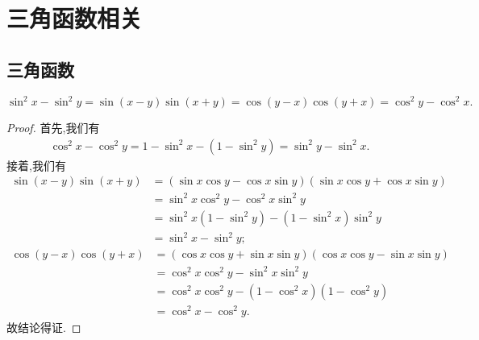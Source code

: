 \documentclass[../../main.tex]{subfiles}
\begin{document}
\section{三角函数相关}

\subsection{三角函数}

\begin{theorem}[三角平方差公式]\label{theorem:三角平方差}
$\sin^2 x-\sin^2 y=\sin(x-y)\sin(x+y)=\cos(y-x)\cos(y+x)=\cos^2 y-\cos^2 x.$
\end{theorem}
\begin{proof}
首先,我们有
\begin{align*}
\cos ^2x-\cos ^2y=1-\sin ^2x-\left( 1-\sin ^2y \right) =\sin ^2y-\sin ^2x.
\end{align*}
接着,我们有
\begin{align*}
\sin(x-y)\sin(x+y) &= (\sin x \cos y - \cos x \sin y)(\sin x \cos y + \cos x \sin y) \\
&= \sin^2 x \cos^2 y - \cos^2 x \sin^2 y \\
&= \sin^2 x (1 - \sin^2 y) - (1 - \sin^2 x) \sin^2 y \\
&= \sin^2 x - \sin^2 y;
\end{align*}
\begin{align*}
\cos(y-x)\cos(y+x) &= (\cos x \cos y + \sin x \sin y)(\cos x \cos y - \sin x \sin y) \\
&= \cos^2 x \cos^2 y - \sin^2 x \sin^2 y \\
&= \cos^2 x \cos^2 y - (1 - \cos^2 x)(1 - \cos^2 y) \\
&= \cos^2 x - \cos^2 y.
\end{align*}
故结论得证.

\end{proof}
\end{document}
